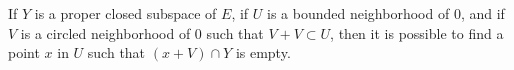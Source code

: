 If $Y$ is a proper closed subspace of $E$, if $U$ is a bounded neighborhood of $0$, and if $V$ is a circled neighborhood of $0$ such that $V + V \subset U$, then it is possible to find a point $x$ in $U$ such that $(x + V) \cap Y$ is empty.
